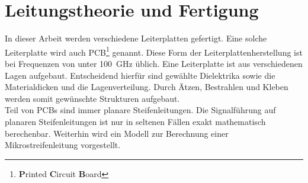 \chapter{Leitungstheorie und Fertigung}
In dieser Arbeit werden verschiedene Leiterplatten gefertigt. Eine solche Leiterplatte wird auch  PCB\footnote{\textbf{P}rinted \textbf{C}ircuit \textbf{B}oard} genannt. Diese Form der Leiterplattenherstellung ist bei Frequenzen von unter \SI{100}{\giga\hertz} üblich. Eine Leiterplatte ist aus verschiedenen Lagen aufgebaut. Entscheidend hierfür sind gewählte Dielektrika sowie die Materialdicken und die Lagenverteilung. Durch Ätzen, Bestrahlen und Kleben werden somit gewünschte Strukturen aufgebaut.  \\
Teil von PCBs sind immer planare Steifenleitungen. Die Signalführung auf planaren Steifenleitungen ist nur in seltenen Fällen exakt mathematisch berechenbar. Weiterhin wird ein Modell zur Berechnung einer Mikrostreifenleitung vorgestellt.
